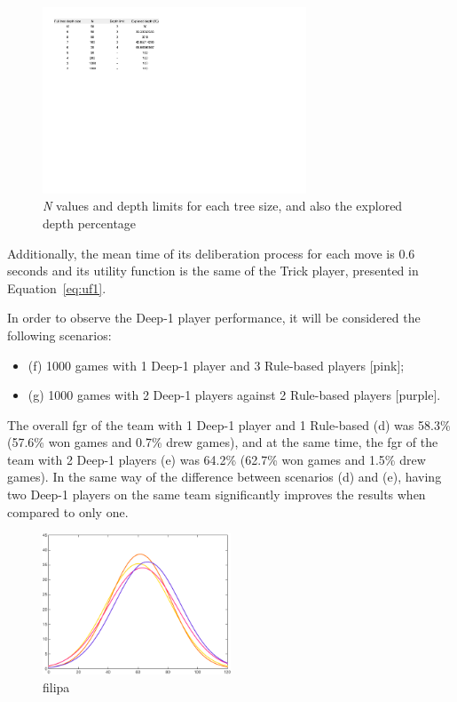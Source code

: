 \begin{figure}[h!]
  \centering
    \includegraphics[width=0.7\textwidth]{./img/5/nDepthLimits}
  \caption{\emph{N} values and depth limits for each tree size, and also the explored depth percentage}
\label{fig:nDepthLimits}
\end{figure}
Additionally, the mean time of its deliberation process for each move is 0.6 seconds and its utility function is the same of the Trick player, presented in Equation~\ref{eq:uf1}.

In order to observe the Deep-1 player performance, it will be considered the following scenarios:
\begin{itemize}
\item (f) 1000 games with 1 Deep-1 player and 3 Rule-based players [pink];
\item (g) 1000 games with 2 Deep-1 players against 2 Rule-based players [purple].
\end{itemize}

The overall \ac{fgr} of the team with 1 Deep-1 player and 1 Rule-based (d) was 58.3\% (57.6\% won games and 0.7\% drew games), and at the same time, the \ac{fgr} of the team with 2 Deep-1 players (e) was 64.2\% (62.7\% won games and 1.5\% drew games).
In the same way of the difference between scenarios (d) and (e), having two Deep-1 players on the same team significantly improves the results when compared to only one.

\begin{figure}[h!]
  \centering
    \includegraphics[width=0.5\textwidth]{./img/5/DEFG}
  \caption{filipa}
\label{fig:DEFG}
\end{figure}

